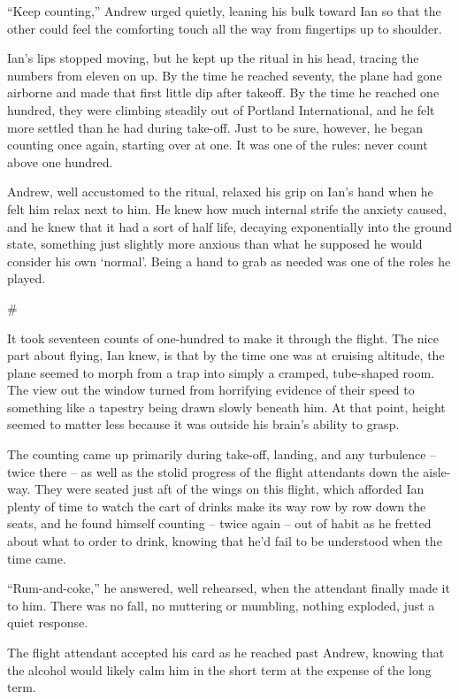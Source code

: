\documentclass[12pt,letterpaper,oneside]{memoir}
\newcommand\secdiv{
  \begin{center}
    \#
  \end{center}
}
\begin{document}
  ``Keep counting,'' Andrew urged quietly, leaning his bulk toward Ian so that the other could feel the comforting touch all the way from fingertips up to shoulder.

  Ian's lips stopped moving, but he kept up the ritual in his head, tracing the numbers from eleven on up. By the time he reached seventy, the plane had gone airborne and made that first little dip after takeoff. By the time he reached one hundred, they were climbing steadily out of Portland International, and he felt more settled than he had during take-off. Just to be sure, however, he began counting once again, starting over at one. It was one of the rules: never count above one hundred.

  Andrew, well accustomed to the ritual, relaxed his grip on Ian's hand when he felt him relax next to him. He knew how much internal strife the anxiety caused, and he knew that it had a sort of half life, decaying exponentially into the ground state, something just slightly more anxious than what he supposed he would consider his own `normal'. Being a hand to grab as needed was one of the roles he played.

  \secdiv

  It took seventeen counts of one-hundred to make it through the flight. The nice part about flying, Ian knew, is that by the time one was at cruising altitude, the plane seemed to morph from a trap into simply a cramped, tube-shaped room. The view out the window turned from horrifying evidence of their speed to something like a tapestry being drawn slowly beneath him. At that point, height seemed to matter less because it was outside his brain's ability to grasp.

  The counting came up primarily during take-off, landing, and any turbulence -- twice there -- as well as the stolid progress of the flight attendants down the aisle-way. They were seated just aft of the wings on this flight, which afforded Ian plenty of time to watch the cart of drinks make its way row by row down the seats, and he found himself counting -- twice again -- out of habit as he fretted about what to order to drink, knowing that he'd fail to be understood when the time came.

  ``Rum-and-coke,'' he answered, well rehearsed, when the attendant finally made it to him. There was no fall, no muttering or mumbling, nothing exploded, just a quiet response.

  The flight attendant accepted his card as he reached past Andrew, knowing that the alcohol would likely calm him in the short term at the expense of the long term.
\end{document}
